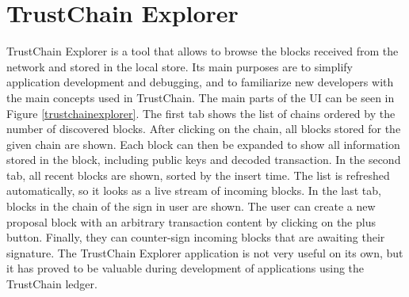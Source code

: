 




\section{TrustChain Explorer}

TrustChain Explorer is a tool that allows to browse the blocks received from the network and stored in the local store. Its main purposes are to simplify application development and debugging, and to familiarize new developers with the main concepts used in TrustChain. The main parts of the UI can be seen in Figure \ref{trustchainexplorer}. The first tab shows the list of chains ordered by the number of discovered blocks. After clicking on the chain, all blocks stored for the given chain are shown. Each block can then be expanded to show all information stored in the block, including public keys and decoded transaction. In the second tab, all recent blocks are shown, sorted by the insert time. The list is refreshed automatically, so it looks as a live stream of incoming blocks. In the last tab, blocks in the chain of the sign in user are shown. The user can create a new proposal block with an arbitrary transaction content by clicking on the plus button. Finally, they can counter-sign incoming blocks that are awaiting their signature. The TrustChain Explorer application is not very useful on its own, but it has proved to be valuable during development of applications using the TrustChain ledger.

